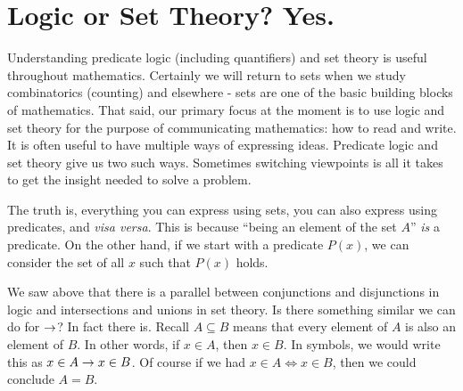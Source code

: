 \documentclass[12pt]{article}
\begin{document}
%
%
%
%

\section{Logic or Set Theory?  Yes.}

Understanding predicate logic (including quantifiers) and set theory is useful throughout mathematics.  Certainly we will return to sets when we study combinatorics (counting) and elsewhere - sets are one of the basic building blocks of mathematics.  That said, our primary focus at the moment is to use logic and set theory for the purpose of communicating mathematics: how to read and write.  It is often useful to have multiple ways of expressing ideas.  Predicate logic and set theory give us two such ways.  Sometimes switching viewpoints is all it takes to get the insight needed to solve a problem.

The truth is, everything you can express using sets, you can also express using predicates, and {\em visa versa}.  This is because ``being an element of the set $A$'' {\em is} a predicate.  On the other hand, if we start with a predicate $P(x)$, we can consider the set of all $x$ such that $P(x)$ holds.  

We saw above that there is a parallel between conjunctions and disjunctions in logic and intersections and unions in set theory.  Is there something similar we can do for $\rightarrow$?  In fact there is.  Recall $A \subseteq B$ means that every element of $A$ is also an element of $B$.  In other words, if $x \in A$, then $x \in B$.  In symbols, we would write this as $x \in A \rightarrow x \in B$.  Of course if we had $x \in A \iff x \in B$, then we could conclude $A = B$.
\end{document}
